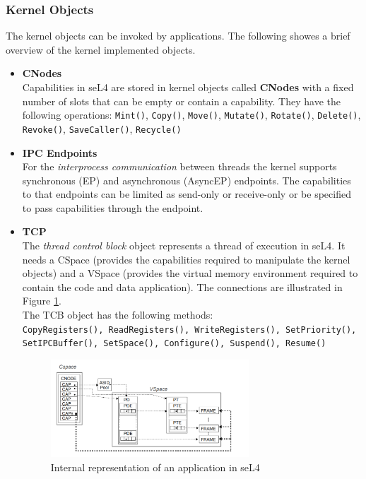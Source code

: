 \documentclass[pdftex,11pt,a4paper]{article}
\begin{document}
	\subsubsection{Kernel Objects}
	
	The kernel objects can be invoked by applications. The following showes a brief overview of the kernel implemented objects. 
	\begin{itemize}
	\item \textbf{CNodes} \\
	Capabilities in seL4 are stored in kernel objects called \textbf{CNodes} with a fixed number of slots that can be empty or contain a capability. They have the following operations:
	\texttt{Mint()}, \texttt{Copy()}, \texttt{Move()}, \texttt{Mutate()}, \texttt{Rotate()}, \texttt{Delete()}, \texttt{Revoke()}, \texttt{SaveCaller()}, \texttt{Recycle()}
	\item \textbf{IPC Endpoints} \\
	For the \textit{interprocess communication} between threads the kernel supports synchronous (EP) and asynchronous (AsyncEP) endpoints. The capabilities to that endpoints can be limited as send-only or receive-only or be specified to pass capabilities through the endpoint.  
	\item \textbf{TCP} \\
	The \textit{thread control block} object represents a thread of execution in seL4. It needs a CSpace (provides the capabilities required to manipulate the kernel objects) and a VSpace (provides the virtual memory environment required to contain the code and data application). The connections are illustrated in Figure \ref{fig:intapp}. \\
	The TCB object has the following methods: \\
	\texttt{CopyRegisters(), ReadRegisters(), WriteRegisters(), SetPriority(), SetIPCBuffer(), SetSpace(), Configure(), Suspend(), Resume()}
	
	\begin{figure}[ht]
	\centering
		\includegraphics[width=0.7\textwidth]{./Pictures/applicationIntern.png}
	\caption[Internal repersentation of application]{Internal representation of an application in seL4 \cite{sel4}}
	\label{fig:intapp}
	\end{figure}
	

\end{itemize}
\end{document}
